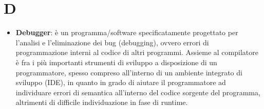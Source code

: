\section{D}
\begin{itemize} 
	\item
	\textbf{Debugger}: è un programma/software specificatamente progettato per l'analisi e l'eliminazione dei bug (debugging), ovvero errori di programmazione interni al codice di altri programmi. Assieme al compilatore è fra i più importanti strumenti di sviluppo a disposizione di un programmatore, spesso compreso all'interno di un ambiente integrato di sviluppo (IDE), in quanto in grado di aiutare il programmatore ad individuare errori di semantica all'interno del codice sorgente del programma, altrimenti di difficile individuazione in fase di runtime. 
\end{itemize}